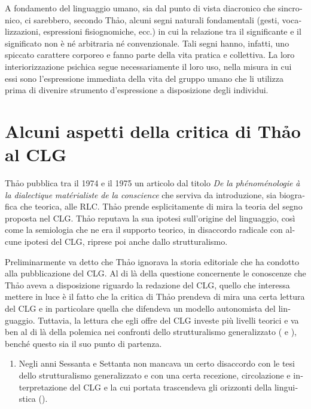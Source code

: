 \documentclass[italian,output=paper,colorlinks,citecolor=brown]{../langscibook}
\begin{document}
\begin{otherlanguage}{italian}
A fondamento del linguaggio umano, sia dal punto di vista diacronico che sincronico, ci sarebbero, secondo Thảo, alcuni segni naturali fondamentali (gesti, vocalizzazioni, espressioni fisiognomiche, ecc.) in cui la relazione tra il significante e il significato non è né arbitraria né convenzionale. Tali segni hanno, infatti, uno spiccato carattere corporeo e fanno parte della vita pratica e collettiva. La loro interiorizzazione psichica segue necessariamente il loro uso, nella misura in cui essi sono l’espressione immediata della vita del gruppo umano che li utilizza prima di divenire strumento d’espressione a disposizione degli individui.

\section{Alcuni aspetti della critica di Thảo al CLG}

Thảo pubblica tra il 1974 e il 1975 un articolo dal titolo \textit{De} \textit{la} \textit{phénoménologie} \textit{à} \textit{la} \textit{dialectique} \textit{matérialiste} \textit{de} \textit{la} \textit{conscience} che serviva da introduzione, sia biografica che teorica, alle RLC. Th\textlatin{ả}o prende esplicitamente di mira la teoria del segno proposta nel CLG. Th\textlatin{ả}o reputava la sua ipotesi sull’origine del linguaggio, così come la semiologia che ne era il supporto teorico, in disaccordo radicale con alcune ipotesi del CLG, riprese poi anche dallo strutturalismo.

Preliminarmente va detto che Th\textlatin{ả}o ignorava la storia editoriale che ha condotto alla pubblicazione del CLG. Al di là della questione concernente le conoscenze che Th\textlatin{ả}o aveva a disposizione riguardo la redazione del CLG, quello che interessa mettere in luce è il fatto che la critica di Th\textlatin{ả}o prendeva di mira una certa lettura del CLG e in particolare quella che difendeva un modello autonomista del linguaggio. Tuttavia, la lettura che egli offre del CLG investe più livelli teorici e va ben al di là della polemica nei confronti dello strutturalismo generalizzato (\citealt{ChissEtAl2015} e \citealt{Léon2013}), benché questo sia il suo punto di partenza.

\begin{enumerate}
\renewcommand{\labelenumi}{{\alph{enumi}})}

\item Negli anni Sessanta e Settanta non mancava un certo disaccordo con le tesi dello strutturalismo generalizzato e con una certa recezione, circolazione e interpretazione del CLG e la cui portata trascendeva gli orizzonti della linguistica (\citealt{Dosse1991, Dosse1992, Puech2013Saussure, Puech2013Structuralism, Lepschy1966}).


\end{enumerate}
\end{otherlanguage}
\end{document}
